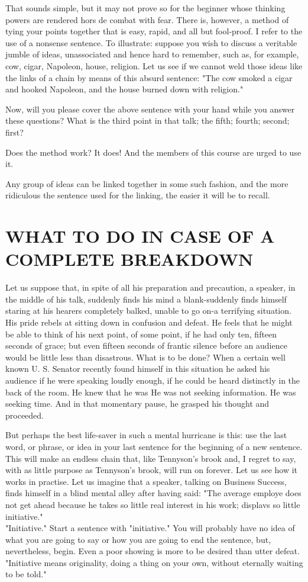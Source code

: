\documentclass[10pt]{article}
\begin{document}
That sounds simple, but it may not prove so for the beginner whose thinking powers are rendered hors de combat with fear. There is, however, a method of tying your points together that is easy, rapid, and all but fool-proof. I refer to the use of a nonsense sentence. To illustrate: suppose you wish to discuss a veritable jumble of ideas, unassociated and hence hard to remember, such as, for example, cow, cigar, Napoleon, house, religion. Let us see if we cannot weld those ideas like the links of a chain by means of this absurd sentence: "The cow smoked a cigar and hooked Napoleon, and the house burned down with religion."

Now, will you please cover the above sentence with your hand while you answer these questions? What is the third point in that talk; the fifth; fourth; second; first?

Does the method work? It does! And the members of this course are urged to use it.

Any group of ideas can be linked together in some such fashion, and the more ridiculous the sentence used for the linking, the easier it will be to recall.

\section*{WHAT TO DO IN CASE OF A COMPLETE BREAKDOWN}
Let us suppose that, in spite of all his preparation and precaution, a speaker, in the middle of his talk, suddenly finds his mind a blank-suddenly finds himself staring at his hearers completely balked, unable to go on-a terrifying situation. His pride rebels at sitting down in confusion and defeat. He feels that he might be able to think of his next point, of some point, if he had only ten, fifteen seconds of grace; but even fifteen seconds of frantic silence before an audience would be little less than disastrous. What is to be done? When a certain well known U. S. Senator recently found himself in this situation he asked his audience if he were speaking loudly enough, if he could be heard distinctly in the back of the room. He knew that he was He was not seeking information. He was seeking time. And in that momentary pause, he grasped his thought and proceeded.

But perhaps the best life-saver in such a mental hurricane is this: use the last word, or phrase, or idea in your last sentence for the beginning of a new sentence. This will make an endless chain that, like Tennyson's brook and, I regret to say, with as little purpose as Tennyson's brook, will run on forever. Let us see how it works in practise. Let us imagine that a speaker, talking on Business Success, finds himself in a blind mental alley after having said: "The average employe does not get ahead because he takes so little real interest in his work; displavs so little initiative."\\
"Initiative." Start a sentence with "initiative." You will probably have no idea of what you are going to say or how you are going to end the sentence, but, nevertheless, begin. Even a poor showing is more to be desired than utter defeat.\\
"Initiative means originality, doing a thing on your own, without eternally waiting to be told."
\end{document}
